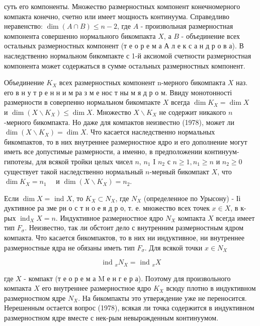 \documentclass[10pt]{article}
\begin{document}
суть его компоненты. Множество размерностных компонент конечномерного компакта конечно, счетно или имеет мощность континуума. Справедливо неравенство: $\operatorname{dim}(A \cap B) \leqslant n-2$, где $A$ - произвольная размерностная компонента совершенно нормального бикомпакта $X$, а $B$ - объединение всех остальных размерностных компонент (т е о р е м а А л е к с а н д р о в а). В наследственно нормальном бикомпакте с 1-й аксиомой счетности размерностная компонента может содержаться в сумме остальных размерностных компонент.



Объединение $K_{X}$ всех размерностных компонент n-мерного бикомпакта $X$ наз. его в н у т р е н н и м ра з м е нос т ны м я д р о м. Ввиду монотонності размерности в соверпенно нормальном бикомпакте $X$ всегда $\operatorname{dim} K_{X}=\operatorname{dim} X \quad$ и $\operatorname{dim}\left(X \backslash K_{X}\right) \leqslant \operatorname{dim} X$. Множество $X \backslash K_{X}$ не содержит никакого $n$-мерного бикомпакта. Но даже для компактов неизвестно (1978), может ли $\operatorname{dim}\left(X \backslash K_{X}\right)=\operatorname{dim} X$. Что касается наследственно нормальных бикомпактов, то в них внутреннее размерностное ядро и его дополнение могут иметь все допустимые размерности, а именно, в предположении континуум-гипотезы, для всякой тройки целых чисел $n$, $n_{1}$ I $n_{2}$ с $n \geqslant 1, n_{1} \geqslant n$ и $n_{2} \geqslant 0$ существует такой наследственно нормальный $n$-мерный бикомпакт $X$, что $\operatorname{dim} K_{X}=n_{1} \quad$ и $\operatorname{dim}\left(X \backslash K_{X}\right)=n_{2}$.



Если $\operatorname{dim} X=$ ind $X$, то $K_{X} \subset N_{X}$, где $N_{X}$ (определенное по Урысону) - Іі дуктивное ра зме рн о с т н о е я д р о, т. е. множество всех точек $x \in X$, в к-рых $\operatorname{ind}_{X} X=n$. Индуктивное размерностное ядро $N_{X}$ компакта $X$ всегда имеет тип $F_{\sigma}$. Неизвестно, так ли обстоит дело с внутренним размерностным ядром компакта. Что касается бикомпактов, то в них ни индуктивное, ни внутреннее размерностные ядра не обязаны иметь тип $F_{\sigma}$. Для всякой точки $x \in N_{X}$



\[

\text { ind }_{x} N_{X}=\text { ind }_{x} X

\]



где $X$ - компакт (т е о р е м а $\mathrm{M}$ е н г е р а). Поэтому для произвольного компакта $X$ его внутреннее размерностное ядро $K_{X}$ всюду плотно в индуктивном размерностном ядре $N_{X}$. На бикомпакты это утверждение уже не переносится. Нерешенным остается вопрос (1978), всякая ли точка содержится в индуктивном размерностном ядре вместе с нек-рым невырожденным континуумом.
\end{document}
